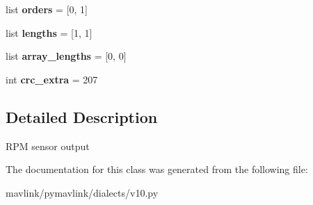 \begin{DoxyCompactItemize}
list {\bfseries orders} = \mbox{[}0, 1\mbox{]}
\item 
\mbox{\label{classpymavlink_1_1dialects_1_1v10_1_1MAVLink__rpm__message_a04e7bb2189762b076dabf52936e6aa05}} 
list {\bfseries lengths} = \mbox{[}1, 1\mbox{]}
\item 
\mbox{\label{classpymavlink_1_1dialects_1_1v10_1_1MAVLink__rpm__message_aecb1236666a6e60b9e4755e7f34acc45}} 
list {\bfseries array\+\_\+lengths} = \mbox{[}0, 0\mbox{]}
\item 
\mbox{\label{classpymavlink_1_1dialects_1_1v10_1_1MAVLink__rpm__message_aa5aa4458690e0d51604312ec6f42e745}} 
int {\bfseries crc\+\_\+extra} = 207
\end{DoxyCompactItemize}


\subsection{Detailed Description}
\begin{DoxyVerb}RPM sensor output
\end{DoxyVerb}
 

The documentation for this class was generated from the following file\+:\begin{DoxyCompactItemize}
\item 
mavlink/pymavlink/dialects/v10.\+py\end{DoxyCompactItemize}
